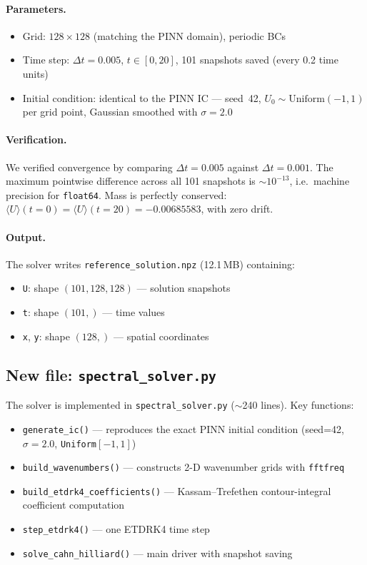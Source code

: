 \documentclass[11pt,a4paper]{article}
\begin{document}
\paragraph{Parameters.}
\begin{itemize}[nosep]
  \item Grid: $128 \times 128$ (matching the PINN domain), periodic BCs
  \item Time step: $\Delta t = 0.005$, $t \in [0, 20]$, 101 snapshots
        saved (every 0.2 time units)
  \item Initial condition: identical to the PINN IC --- seed~42,
        $U_0 \sim \mathrm{Uniform}(-1,1)$ per grid point, Gaussian
        smoothed with $\sigma = 2.0$
\end{itemize}

\paragraph{Verification.}
We verified convergence by comparing $\Delta t = 0.005$ against
$\Delta t = 0.001$.  The maximum pointwise difference across all 101
snapshots is $\sim 10^{-13}$, i.e.\ machine precision for
\texttt{float64}.  Mass is perfectly conserved:
$\langle U \rangle(t{=}0) = \langle U \rangle(t{=}20) = -0.00685583$,
with zero drift.

\paragraph{Output.}
The solver writes \texttt{reference\_solution.npz} (12.1\,MB)
containing:
\begin{itemize}[nosep]
  \item \texttt{U}: shape $(101, 128, 128)$ --- solution snapshots
  \item \texttt{t}: shape $(101,)$ --- time values
  \item \texttt{x}, \texttt{y}: shape $(128,)$ --- spatial coordinates
\end{itemize}

\subsection{New file: \texttt{spectral\_solver.py}}

The solver is implemented in \texttt{spectral\_solver.py} ($\sim$240
lines).  Key functions:

\begin{itemize}[nosep]
  \item \texttt{generate\_ic()} --- reproduces the exact PINN initial
        condition (seed=42, $\sigma=2.0$, \texttt{Uniform}$[-1,1]$)
  \item \texttt{build\_wavenumbers()} --- constructs 2-D wavenumber
        grids with \texttt{fftfreq}
  \item \texttt{build\_etdrk4\_coefficients()} --- Kassam--Trefethen
        contour-integral coefficient computation
  \item \texttt{step\_etdrk4()} --- one ETDRK4 time step
  \item \texttt{solve\_cahn\_hilliard()} --- main driver with snapshot
        saving
\end{itemize}
\end{document}
